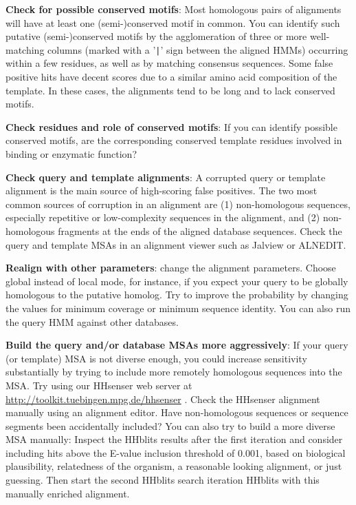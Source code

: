 \documentclass[11pt,a4paper]{article}
\begin{document}
{\bf Check for possible conserved motifs}:
Most homologous pairs of alignments will have at least one (semi-)conserved motif in common. You can identify such putative (semi-)conserved motifs by the agglomeration of three or more well-matching columns (marked with a '\verb`|`' sign between the aligned HMMs) occurring within a few residues, as well as by matching consensus sequences. Some false positive hits have decent scores due to a similar amino acid composition of the template. In these cases, the alignments tend to be long and to lack conserved motifs.

{\bf Check residues and role of conserved motifs}: 
If you can identify possible conserved motifs, are the corresponding conserved template residues involved in binding or enzymatic function?

{\bf Check query and template alignments}: 
A corrupted query or template alignment is the main source of high-scoring false positives. The two most common sources of corruption in an alignment are (1) non-homologous sequences, especially repetitive or low-complexity sequences in the alignment, and (2) non-homologous fragments at the ends of the aligned database sequences. Check the query and template MSAs in an alignment viewer such as Jalview or ALNEDIT.

{\bf Realign with other parameters}: 
change the alignment parameters. Choose global instead of local mode, for instance, if you expect your query to be globally homologous to the putative homolog. Try to improve the probability by changing the values for minimum coverage or minimum sequence identity. You can also run the query HMM against other databases.

{\bf Build the query and/or database MSAs more aggressively}:
If your query (or template) MSA is not diverse enough, you could increase sensitivity substantially by trying to include more remotely homologous sequences into the MSA. Try using our HHsenser web server at \url{http://toolkit.tuebingen.mpg.de/hhsenser} \cite{Soding:2006b}. Check the HHsenser alignment manually using an alignment editor. Have non-homologous sequences or sequence segments been accidentally included? You can also try to build a more diverse MSA manually: Inspect the HHblits results after the first iteration and consider including hits above the E-value inclusion threshold of 0.001, based on biological plausibility, relatedness of the organism, a reasonable looking alignment, or just guessing. Then start the second HHblits search iteration HHblits with this manually enriched alignment. 
\end{document}
